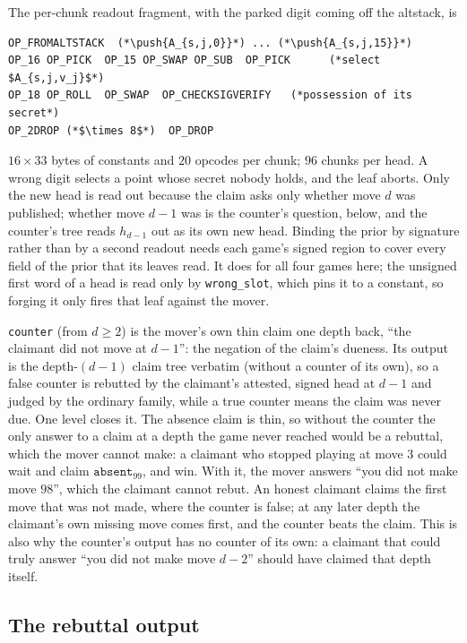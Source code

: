 \documentclass[11pt]{article}
\newcommand{\push}[1]{\ensuremath{\langle #1\rangle}}
\begin{document}
The per-chunk readout fragment, with the parked digit coming off the
altstack, is
\begin{lstlisting}[style=script]
OP_FROMALTSTACK  (*\push{A_{s,j,0}}*) ... (*\push{A_{s,j,15}}*)
OP_16 OP_PICK  OP_15 OP_SWAP OP_SUB  OP_PICK      (*select $A_{s,j,v_j}$*)
OP_18 OP_ROLL  OP_SWAP  OP_CHECKSIGVERIFY   (*possession of its secret*)
OP_2DROP (*$\times 8$*)  OP_DROP
\end{lstlisting}
$16 \times 33$ bytes of constants and $20$ opcodes per chunk; $96$
chunks per head. A wrong digit selects a point whose secret nobody
holds, and the leaf aborts. Only the new head is read out because the
claim asks only whether move $d$ was published; whether move $d-1$ was
is the counter's question, below, and the counter's tree reads $h_{d-1}$
out as its own new head. Binding the prior by signature rather than by
a second readout needs each game's signed region to cover every field
of the prior that its leaves read. It does for all four games here; the
unsigned first word of a head is read only by \texttt{wrong\_slot}, which
pins it to a constant, so forging it only fires that leaf against the
mover.

\texttt{counter} (from $d \ge 2$) is the mover's own thin claim one
depth back, ``the claimant did not move at $d-1$'': the negation of the
claim's dueness. Its output is the depth-$(d-1)$ claim tree verbatim
(without a counter of its own), so a false counter is rebutted by the
claimant's attested, signed head at $d-1$ and judged by the ordinary
family, while a true counter means the claim was never due. One level
closes it. The absence claim is thin, so without the counter the only
answer to a claim at a depth the game never reached would be a
rebuttal, which the mover cannot make: a claimant who stopped
playing at move $3$ could wait and claim $\texttt{absent}_{99}$, and
win. With it, the mover answers ``you did not make move $98$'', which
the claimant cannot rebut. An honest claimant claims the first move
that was not made, where the counter is false; at any later depth the
claimant's own missing move comes first, and the counter beats the
claim. This is also why the counter's output has no counter of its
own: a claimant that could truly answer ``you did not make move
$d-2$'' should have claimed that depth itself.

\subsection{The rebuttal output}
\label{sec:graph:rebutted}
\end{document}
